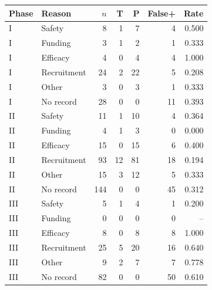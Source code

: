 \begin{tabular}{llrrrrr}
\toprule
Phase & Reason & $n$ & T & P & False+ & Rate \\
\midrule
I & Safety & 8 & 1 & 7 & 4 & 0.500 \\
I & Funding & 3 & 1 & 2 & 1 & 0.333 \\
I & Efficacy & 4 & 0 & 4 & 4 & 1.000 \\
I & Recruitment & 24 & 2 & 22 & 5 & 0.208 \\
I & Other & 3 & 0 & 3 & 1 & 0.333 \\
I & No record & 28 & 0 & 0 & 11 & 0.393 \\
II & Safety & 11 & 1 & 10 & 4 & 0.364 \\
II & Funding & 4 & 1 & 3 & 0 & 0.000 \\
II & Efficacy & 15 & 0 & 15 & 6 & 0.400 \\
II & Recruitment & 93 & 12 & 81 & 18 & 0.194 \\
II & Other & 15 & 3 & 12 & 5 & 0.333 \\
II & No record & 144 & 0 & 0 & 45 & 0.312 \\
III & Safety & 5 & 1 & 4 & 1 & 0.200 \\
III & Funding & 0 & 0 & 0 & 0 & -- \\
III & Efficacy & 8 & 0 & 8 & 8 & 1.000 \\
III & Recruitment & 25 & 5 & 20 & 16 & 0.640 \\
III & Other & 9 & 2 & 7 & 7 & 0.778 \\
III & No record & 82 & 0 & 0 & 50 & 0.610 \\
\bottomrule
\end{tabular}
